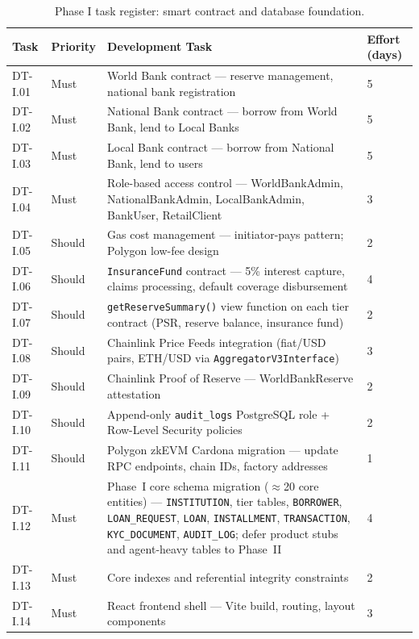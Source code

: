 \documentclass[12pt,a4paper]{report}
\newcommand{\tableheadcolor}{\rowcolor{TableHeadBg}}
\begin{document}
\begin{table}[H]
\centering
\caption[Phase I task register]{Phase I task register: smart contract and database foundation.%
\footnotemark}
\label{tab:phaseI-contracts}
\small
\begin{tabular}{p{1.8cm}p{1.8cm}p{7.5cm}p{1.5cm}}
\toprule
\tableheadcolor
\textbf{Task} & \textbf{Priority} & \textbf{Development Task} & \textbf{Effort (days)} \\
\midrule
DT-I.01 & Must & World Bank contract --- reserve management, national bank registration & 5 \\
DT-I.02 & Must & National Bank contract --- borrow from World Bank, lend to Local Banks & 5 \\
DT-I.03 & Must & Local Bank contract --- borrow from National Bank, lend to users & 5 \\
DT-I.04 & Must & Role-based access control --- WorldBankAdmin, NationalBankAdmin, LocalBankAdmin, BankUser, RetailClient & 3 \\
DT-I.05 & Should & Gas cost management --- initiator-pays pattern; Polygon low-fee design & 2 \\
DT-I.06 & Should & \texttt{InsuranceFund} contract --- 5\% interest capture, claims processing, default coverage disbursement & 4 \\
DT-I.07 & Should & \texttt{getReserveSummary()} view function on each tier contract (PSR, reserve balance, insurance fund) & 2 \\
DT-I.08 & Should & Chainlink Price Feeds integration (fiat/USD pairs, ETH/USD via \texttt{AggregatorV3Interface}) & 3 \\
DT-I.09 & Should & Chainlink Proof of Reserve --- WorldBankReserve attestation & 2 \\
DT-I.10 & Should & Append-only \texttt{audit\_logs} PostgreSQL role + Row-Level Security policies & 2 \\
DT-I.11 & Should & Polygon zkEVM Cardona migration --- update RPC endpoints, chain IDs, factory addresses & 1 \\
DT-I.12 & Must & Phase~I core schema migration (\(\approx\)20 core entities) --- \texttt{INSTITUTION}, tier tables, \texttt{BORROWER}, \texttt{LOAN\_REQUEST}, \texttt{LOAN}, \texttt{INSTALLMENT}, \texttt{TRANSACTION}, \texttt{KYC\_DOCUMENT}, \texttt{AUDIT\_LOG}; defer product stubs and agent-heavy tables to Phase~II & 4 \\
DT-I.13 & Must & Core indexes and referential integrity constraints & 2 \\
DT-I.14 & Must & React frontend shell --- Vite build, routing, layout components & 3 \\

\end{tabular}
\end{table}
\end{document}
